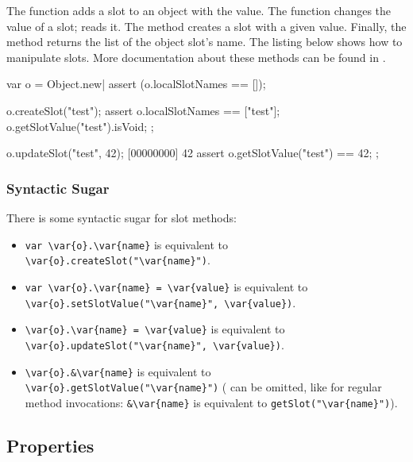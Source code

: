 The  function adds a slot to an object with the
 value. The  function changes
the value of a slot;  reads it. The
 method creates a slot with a given value. Finally,
the  method returns the list of the object
slot's name. The listing below shows how to manipulate slots. More
documentation about these methods can be found in .

\begin{urbiscript}
var o = Object.new|
assert (o.localSlotNames == []);

o.createSlot("test");
assert
{
  o.localSlotNames == ["test"];
  o.getSlotValue("test").isVoid;
};

o.updateSlot("test", 42);
[00000000] 42
assert
{
  o.getSlotValue("test") == 42;
};
\end{urbiscript}

\subsubsection{Syntactic Sugar}

There is some syntactic sugar for slot methods:
\begin{itemize}
\item \lstinline|var \var{o}.\var{name}| is equivalent to
  \lstinline[style=varInString]|\var{o}.createSlot("\var{name}")|.
\item \lstinline|var \var{o}.\var{name} = \var{value}| is equivalent to
  \lstinline[style=varInString]|\var{o}.setSlotValue("\var{name}", \var{value})|.
\item \lstinline|\var{o}.\var{name} = \var{value}| is equivalent to
  \lstinline[style=varInString]|\var{o}.updateSlot("\var{name}", \var{value})|.
\item \lstinline|\var{o}.&\var{name}| is equivalent to
  \lstinline[style=varInString]|\var{o}.getSlotValue("\var{name}")| ( can
  be omitted, like for regular method invocations: \lstinline|&\var{name}|
  is equivalent to \lstinline[style=varInString]|getSlot("\var{name}")|).
\end{itemize}


\subsection{Properties}
\label{sec:lang:prop}


